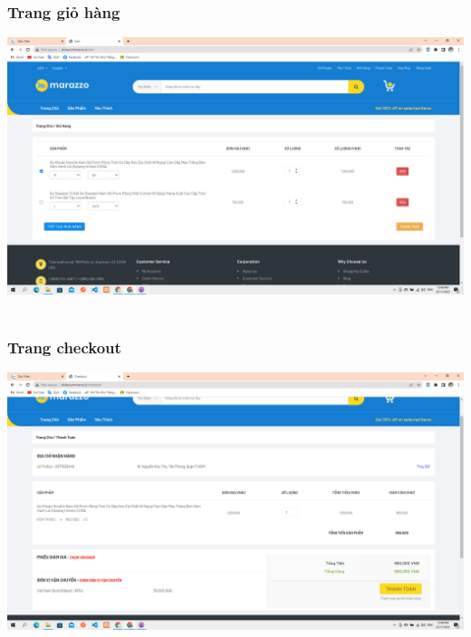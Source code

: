 \documentclass[12pt,a4paper,2sides]{report}
\begin{document}
\subsubsection{Trang giỏ hàng}
    \includegraphics[width=1\linewidth]{lib/results/giohang.jpg}\\\vspace*{1cm} 
    \hspace{5cm}{Hình 41. Trang giỏ hàng}\\
\subsubsection{Trang checkout}
    \includegraphics[width=1\linewidth]{lib/results/checkout.jpg}\\\vspace*{1cm} 
    \hspace{5cm}{Hình 42. Trang checkout}\\
\end{document}
